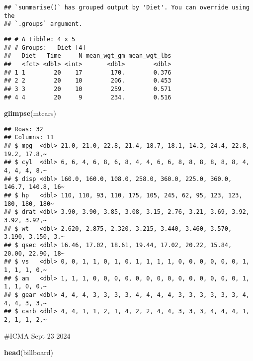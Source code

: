 \documentclass[
]{article}
\newenvironment{Shaded}{\begin{snugshade}}{\end{snugshade}}
\newcommand{\FunctionTok}[1]{\textcolor[rgb]{0.13,0.29,0.53}{\textbf{#1}}}
\newcommand{\NormalTok}[1]{#1}
\begin{document}
\begin{verbatim}
## `summarise()` has grouped output by 'Diet'. You can override using the
## `.groups` argument.
\end{verbatim}

\begin{verbatim}
## # A tibble: 4 x 5
## # Groups:   Diet [4]
##   Diet   Time     N mean_wgt_gm mean_wgt_lbs
##   <fct> <dbl> <int>       <dbl>        <dbl>
## 1 1        20    17        170.        0.376
## 2 2        20    10        206.        0.453
## 3 3        20    10        259.        0.571
## 4 4        20     9        234.        0.516
\end{verbatim}

\begin{Shaded}
\begin{Highlighting}[]
\FunctionTok{glimpse}\NormalTok{(mtcars)}
\end{Highlighting}
\end{Shaded}

\begin{verbatim}
## Rows: 32
## Columns: 11
## $ mpg  <dbl> 21.0, 21.0, 22.8, 21.4, 18.7, 18.1, 14.3, 24.4, 22.8, 19.2, 17.8,~
## $ cyl  <dbl> 6, 6, 4, 6, 8, 6, 8, 4, 4, 6, 6, 8, 8, 8, 8, 8, 8, 4, 4, 4, 4, 8,~
## $ disp <dbl> 160.0, 160.0, 108.0, 258.0, 360.0, 225.0, 360.0, 146.7, 140.8, 16~
## $ hp   <dbl> 110, 110, 93, 110, 175, 105, 245, 62, 95, 123, 123, 180, 180, 180~
## $ drat <dbl> 3.90, 3.90, 3.85, 3.08, 3.15, 2.76, 3.21, 3.69, 3.92, 3.92, 3.92,~
## $ wt   <dbl> 2.620, 2.875, 2.320, 3.215, 3.440, 3.460, 3.570, 3.190, 3.150, 3.~
## $ qsec <dbl> 16.46, 17.02, 18.61, 19.44, 17.02, 20.22, 15.84, 20.00, 22.90, 18~
## $ vs   <dbl> 0, 0, 1, 1, 0, 1, 0, 1, 1, 1, 1, 0, 0, 0, 0, 0, 0, 1, 1, 1, 1, 0,~
## $ am   <dbl> 1, 1, 1, 0, 0, 0, 0, 0, 0, 0, 0, 0, 0, 0, 0, 0, 0, 1, 1, 1, 0, 0,~
## $ gear <dbl> 4, 4, 4, 3, 3, 3, 3, 4, 4, 4, 4, 3, 3, 3, 3, 3, 3, 4, 4, 4, 3, 3,~
## $ carb <dbl> 4, 4, 1, 1, 2, 1, 4, 2, 2, 4, 4, 3, 3, 3, 4, 4, 4, 1, 2, 1, 1, 2,~
\end{verbatim}

\#ICMA Sept 23 2024

\begin{Shaded}
\begin{Highlighting}[]
\FunctionTok{head}\NormalTok{(billboard)}
\end{Highlighting}
\end{Shaded}
\end{document}
